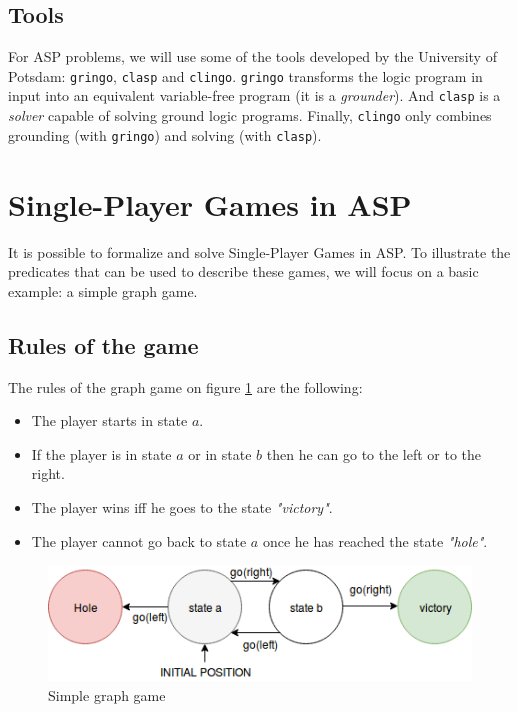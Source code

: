 \subsection{Tools}

For ASP problems, we will use some of the tools developed by the University of Potsdam: \texttt{gringo}, \texttt{clasp} and \texttt{clingo}. \texttt{gringo} transforms the logic program in input into an equivalent variable-free program (it is a \textit{grounder}). And \texttt{clasp} is a \textit{solver} capable of solving ground logic programs. Finally, \texttt{clingo} only combines grounding (with \texttt{gringo}) and solving (with \texttt{clasp}).
\section{Single-Player Games in ASP}

It is possible to formalize and solve Single-Player Games in ASP. To illustrate the predicates that can be used to describe these games, we will focus on a basic example: a simple graph game.


\subsection{Rules of the game}

The rules of the graph game on figure \ref{fig:agent} are the following:
\begin{itemize}
\item The player starts in state $a$.
\item If the player is in state $a$ or in state $b$ then he can go to the left or to the right.
\item The player wins iff he goes to the state \textit{"victory"}.
\item The player cannot go back to state $a$ once he has reached the state \textit{"hole"}.
\end{itemize}

\begin{figure}[h]
\centering
\includegraphics[width = 0.8\hsize]{diagram1.png}
\caption{Simple graph game}
\label{fig:agent}
\end{figure}

